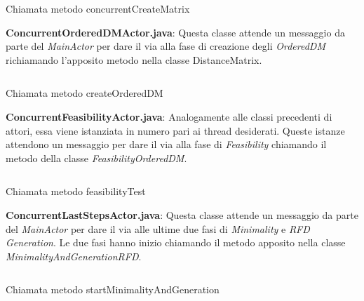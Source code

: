 \begin{listing}[H]
	\inputminted[]{java}{Codici/ConcurrentDMActor.java}
	\caption{Chiamata metodo concurrentCreateMatrix}
	\label{Code:9}
\end{listing}
\textbf{ConcurrentOrderedDMActor.java}:
Questa classe attende un messaggio da parte del \emph{MainActor} per dare il via alla fase di creazione degli \emph{OrderedDM} richiamando l'apposito metodo nella classe DistanceMatrix.\\
\begin{listing}[H]
	\inputminted[]{java}{Codici/ConcurrentOrderedDMActor.java}
	\caption{Chiamata metodo createOrderedDM}
	\label{Code:10}
\end{listing}
\textbf{ConcurrentFeasibilityActor.java}:
Analogamente alle classi precedenti di attori, essa viene istanziata in numero pari ai thread desiderati.
Queste istanze attendono un messaggio per dare il via alla fase di \emph{Feasibility} chiamando il metodo della classe \emph{FeasibilityOrderedDM}.\\
\begin{listing}[H]
	\inputminted[]{java}{Codici/ConcurrentFeasibilityActor.java}
	\caption{Chiamata metodo feasibilityTest}
	\label{Code:11}
\end{listing}
\textbf{ConcurrentLastStepsActor.java}:
Questa classe attende un messaggio da parte del \emph{MainActor} per dare il via alle ultime due fasi di \emph{Minimality} e \emph{RFD Generation}.
Le due fasi hanno inizio chiamando il metodo apposito nella classe \emph{MinimalityAndGenerationRFD}.
\begin{listing}[H]
	\inputminted[]{java}{Codici/ConcurrentLastStepsActor.java}
	\caption{Chiamata metodo startMinimalityAndGeneration}
	\label{Code:12}
\end{listing}
